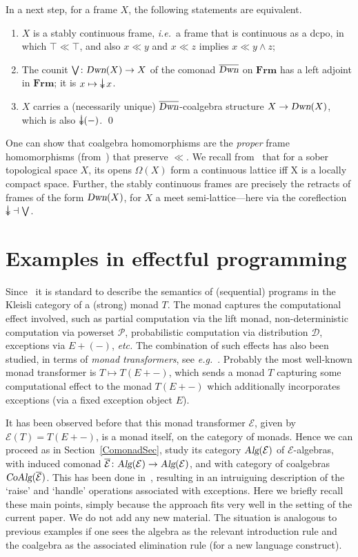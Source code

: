 \documentclass{LMCS}
\newcommand{\Cat}[1]{\ensuremath{\mathbf{#1}}}
\newcommand{\Alg}{\textsl{Alg}\xspace}
\newcommand{\CoAlg}{\textsl{CoAlg}\xspace}
\newcommand{\Dwn}{\textsl{Dwn}\xspace}
\newcommand{\Dstr}{\ensuremath{\mathcal{D}}}
\newcommand{\E}{\ensuremath{\mathcal{E}}}
\newcommand{\powerset}{\mathcal{P}}
\newcommand{\Pow}{\powerset}
\newcommand{\Frm}{\Cat{Frm}\xspace}
\newcommand{\conjun}{\mathrel{\wedge}}
\def\ddownset{\mathop{\rlap{$\downarrow$}\raisebox{.4ex}{$\downarrow$}}}
\begin{document}
In a next step, for a frame $X$, the following statements are
equivalent.
\begin{enumerate}[(1)]
\item $X$ is a stably continuous frame, \textit{i.e.}~a frame that is
  continuous as a dcpo, in which $\top\ll \top$, and also $x\ll y$ and
  $x\ll z$ implies $x\ll y\conjun z$;

\item The counit $\bigvee\colon\Dwn(X)\rightarrow X$ of the
comonad $\overline{\Dwn}$ on \Frm has a left adjoint in \Frm;
it is $x\mapsto \ddownset x$.

\item $X$ carries a (necessarily unique) $\overline{\Dwn}$-coalgebra
  structure $X \rightarrow \Dwn(X)$, which is also
  $\ddownset(-)$. \qed
\end{enumerate}
One can show that coalgebra homomorphisms are the \textit{proper}
frame homomorphisms (from~\cite{BanaschewskiB88}) that preserve $\ll$.
We recall from~\cite[VII, 4.5]{Johnstone82} that for a sober
topological space $X$, its opens $\Omega(X)$ form a continuous lattice
iff X is a locally compact space.  Further, the stably continuous
frames are precisely the retracts of frames of the form $\Dwn(X)$, for
$X$ a meet semi-lattice---here via the coreflection $\ddownset \dashv
\bigvee$.


\section{Examples in effectful programming}\label{ExceptionSec}

Since~\cite{Moggi91a} it is standard to describe the semantics of
(sequential) programs in the Kleisli category of a (strong) monad
$T$. The monad captures the computational effect involved, such as
partial computation via the lift monad, non-deterministic computation
via powerset $\Pow$, probabilistic computation via distribution
$\Dstr$, exceptions via $E+(-)$, \textit{etc.} The combination of such
effects has also been studied, in terms of \emph{monad transformers},
see \textit{e.g.}~\cite{LiangHJ95,JaskelioffaM10}. Probably the most
well-known monad transformer is $T \mapsto T(E+-)$, which sends a
monad $T$ capturing some computational effect to the monad $T(E+-)$
which additionally incorporates exceptions (via a fixed exception
object $E$).

It has been observed before that this monad transformer $\E$, given by
$\E(T) = T(E+-)$, is a monad itself, on the category of monads. Hence
we can proceed as in Section~\ref{ComonadSec}, study its category
$\Alg(\E)$ of $\E$-algebras, with induced comonad $\overline{\E}
\colon \Alg(\E) \rightarrow \Alg(\E)$, and with category of coalgebras
$\CoAlg(\overline{\E})$. This has been done in~\cite{Levy06},
resulting in an intruiguing description of the `raise' and `handle'
operations associated with exceptions. Here we briefly recall these
main points, simply because the approach fits very well in the setting
of the current paper. We do not add any new material. The situation is
analogous to previous examples if one sees the algebra as the relevant
introduction rule and the coalgebra as the associated elimination rule
(for a new language construct).
\end{document}
